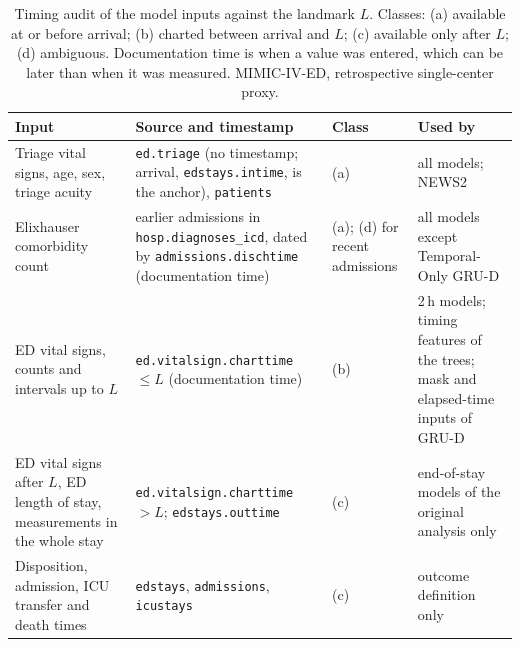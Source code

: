 \begin{table}[t]
\centering
\caption{Timing audit of the model inputs against the landmark $L$. Classes: (a) available at or before arrival; (b) charted between arrival and $L$; (c) available only after $L$; (d) ambiguous. Documentation time is when a value was entered, which can be later than when it was measured. MIMIC-IV-ED, retrospective single-center proxy.}
\label{tab:timing}
\footnotesize
\begin{tabular}{p{4.2cm}p{6.0cm}p{1.3cm}p{4.2cm}}
\toprule
Input & Source and timestamp & Class & Used by \\
\midrule
Triage vital signs, age, sex, triage acuity & \texttt{ed.triage} (no timestamp; arrival, \texttt{edstays.intime}, is the anchor), \texttt{patients} & (a) & all models; NEWS2 \\
Elixhauser comorbidity count & earlier admissions in \texttt{hosp.diagnoses\_icd}, dated by \texttt{admissions.dischtime} (documentation time) & (a); (d) for recent admissions & all models except Temporal-Only GRU-D \\
ED vital signs, counts and intervals up to $L$ & \texttt{ed.vitalsign.charttime} $\le L$ (documentation time) & (b) & 2\,h models; timing features of the trees; mask and elapsed-time inputs of GRU-D \\
ED vital signs after $L$, ED length of stay, measurements in the whole stay & \texttt{ed.vitalsign.charttime} $> L$; \texttt{edstays.outtime} & (c) & end-of-stay models of the original analysis only \\
Disposition, admission, ICU transfer and death times & \texttt{edstays}, \texttt{admissions}, \texttt{icustays} & (c) & outcome definition only \\
\bottomrule
\end{tabular}
\end{table}

